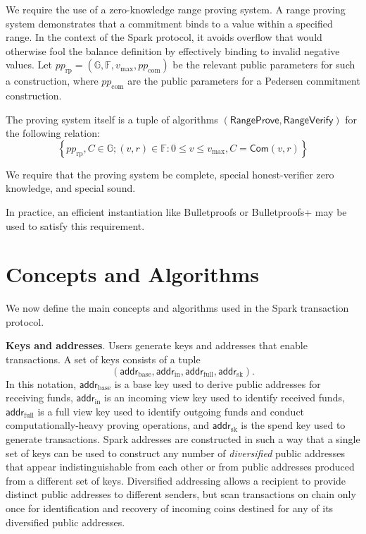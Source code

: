 \documentclass{llncs}
\newcommand{\G}{\mathbb{G}}
\newcommand{\F}{\mathbb{F}}
\newcommand{\func}[1]{\mathsf{#1}}
\newcommand{\addr}{\func{addr}}
\newcommand{\com}{\func{Com}}
\begin{document}
We require the use of a zero-knowledge range proving system.
A range proving system demonstrates that a commitment binds to a value within a specified range.
In the context of the Spark protocol, it avoids overflow that would otherwise fool the balance definition by effectively binding to invalid negative values.
Let $pp_{\text{rp}} = (\G, \F, v_{\text{max}}, pp_{\text{com}})$ be the relevant public parameters for such a construction, where $pp_{\text{com}}$ are the public parameters for a Pedersen commitment construction.

The proving system itself is a tuple of algorithms $(\func{RangeProve},\func{RangeVerify})$ for the following relation:
$$\left\{ pp_{\text{rp}}, C \in \G ; (v, r) \in \F : 0 \leq v \leq v_{\text{max}}, C = \com(v,r) \right\}$$

We require that the proving system be complete, special honest-verifier zero knowledge, and special sound.

In practice, an efficient instantiation like Bulletproofs \cite{bp} or Bulletproofs+ \cite{bp_plus} may be used to satisfy this requirement.


\section{Concepts and Algorithms}

We now define the main concepts and algorithms used in the Spark transaction protocol.

\textbf{Keys and addresses}. Users generate keys and addresses that enable transactions.
A set of keys consists of a tuple $$(\addr_{\text{base}}, \addr_{\text{in}}, \addr_{\text{full}}, \addr_{\text{sk}}).$$
In this notation, $\addr_{\text{base}}$ is a base key used to derive public addresses for receiving funds, $\addr_{\text{in}}$ is an incoming view key used to identify received funds, $\addr_{\text{full}}$ is a full view key used to identify outgoing funds and conduct computationally-heavy proving operations, and $\addr_{\text{sk}}$ is the spend key used to generate transactions.
Spark addresses are constructed in such a way that a single set of keys can be used to construct any number of \textit{diversified} public addresses that appear indistinguishable from each other or from public addresses produced from a different set of keys.
Diversified addressing allows a recipient to provide distinct public addresses to different senders, but scan transactions on chain only once for identification and recovery of incoming coins destined for any of its diversified public addresses.
\end{document}
